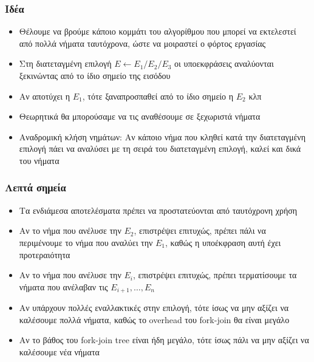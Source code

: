 \documentclass{beamer}
\begin{document}
\begin{frame}
  \frametitle{Ιδέα}
  \begin{itemize}
	\item Θέλουμε να βρούμε κάποιο κομμάτι του αλγορίθμου που μπορεί να εκτελεστεί από πολλά νήματα ταυτόχρονα, ώστε να μοιραστεί ο φόρτος εργασίας \pause
	\item Στη διατεταγμένη επιλογή $E \leftarrow E_1 / E_2 /  E_3$ οι υποεκφράσεις αναλύονται ξεκινώντας από το ίδιο σημείο της εισόδου  \pause
	\item Αν αποτύχει η $E_1$, τότε ξαναπροσπαθεί από το ίδιο σημείο η $E_2$ κλπ\pause
	\item Θεωρητικά θα μπορούσαμε να τις αναθέσουμε σε ξεχωριστά νήματα\pause
	\item Αναδρομική κλήση νημάτων: Αν κάποιο νήμα που κληθεί κατά την διατεταγμένη επιλογή πάει να αναλύσει με τη σειρά του διατεταγμένη επιλογή, καλεί και δικά του νήματα
  \end{itemize}

\end{frame}

\begin{frame}
  \frametitle{Λεπτά σημεία}
  \begin{itemize}
	\item Τα ενδιάμεσα αποτελέσματα πρέπει να προστατεύονται από ταυτόχρονη χρήση\pause
	\item Αν το νήμα που ανέλυσε την $E_2$, επιστρέψει επιτυχώς, πρέπει πάλι να περιμένουμε το νήμα που αναλύει την $E_1$, καθώς η υποέκφραση αυτή έχει προτεραιότητα \pause
	\item Αν το νήμα που ανέλυσε την $E_i$, επιστρέψει επιτυχώς, πρέπει τερματίσουμε τα νήματα που ανέλαβαν τις $E_{i+1}, \dots, E_n$ \pause
	\item Aν υπάρχουν πολλές εναλλακτικές στην επιλογή, τότε ίσως να μην αξίζει να καλέσουμε πολλά νήματα, καθώς το overhead του fork-join θα είναι μεγάλο \pause
	\item Αν το βάθος του fork-join tree είναι ήδη μεγάλο, τότε ίσως πάλι να μην αξίζει να καλέσουμε νέα νήματα
  \end{itemize}
\end{frame}
\end{document}

